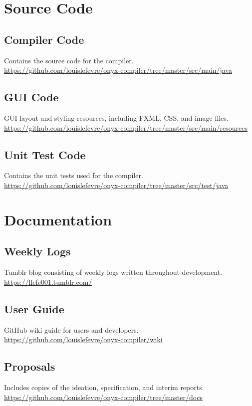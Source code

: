 \documentclass[
]{report}
\begin{document}
\begin{appendices}
	\chapter{Source Code}
	\section{Compiler Code}
	\label{appendix:compiler-code}
	Contains the source code for the compiler.\\
	\url{https://github.com/louislefevre/onyx-compiler/tree/master/src/main/java}
	\section{GUI Code}
	\label{appendix:gui-code}
	GUI layout and styling resources, including FXML, CSS, and image files.\\
	\url{https://github.com/louislefevre/onyx-compiler/tree/master/src/main/resources}
	\section{Unit Test Code}
	\label{appendix:unit-test-code}
	Contains the unit tests used for the compiler.\\
	\url{https://github.com/louislefevre/onyx-compiler/tree/master/src/test/java}

	\chapter{Documentation}
	\section{Weekly Logs}
	Tumblr blog consisting of weekly logs written throughout development.\\
	\url{https://llefe001.tumblr.com/}
	\section{User Guide}
	GitHub wiki guide for users and developers.\\
	\url{https://github.com/louislefevre/onyx-compiler/wiki}
	\section{Proposals}
	Includes copies of the ideation, specification, and interim reports.\\
	\url{https://github.com/louislefevre/onyx-compiler/tree/master/docs}
	

\end{appendices}
\end{document}
